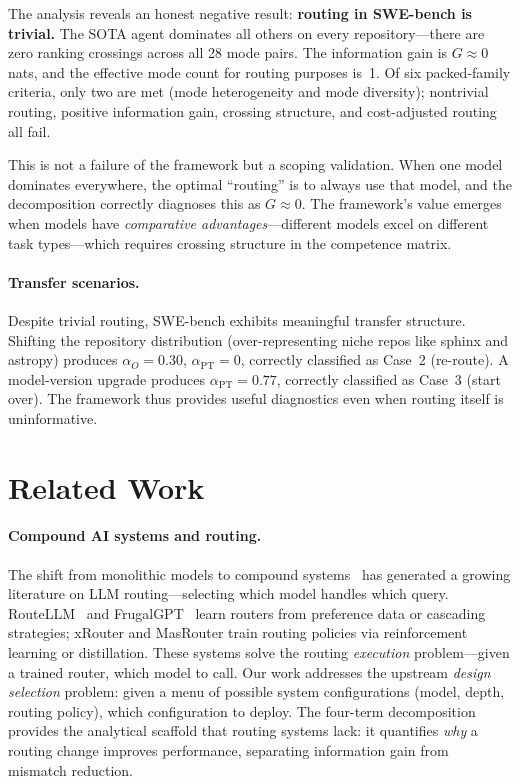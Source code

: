 \documentclass[11pt]{article}
\begin{document}
The analysis reveals an honest negative result: \textbf{routing in
SWE-bench is trivial.}  The SOTA agent dominates all others on every
repository---there are zero ranking crossings across all 28 mode pairs.
The information gain is $G \approx 0$ nats, and the effective mode count
for routing purposes is~1.  Of six packed-family criteria, only two are
met (mode heterogeneity and mode diversity); nontrivial routing, positive
information gain, crossing structure, and cost-adjusted routing all fail.

This is not a failure of the framework but a scoping validation.  When one
model dominates everywhere, the optimal ``routing'' is to always use that
model, and the decomposition correctly diagnoses this as
$G \approx 0$.  The framework's value emerges when models have
\emph{comparative advantages}---different models excel on different task
types---which requires crossing structure in the competence matrix.

\paragraph{Transfer scenarios.}
Despite trivial routing, SWE-bench exhibits meaningful transfer structure.
Shifting the repository distribution (over-representing niche repos like
sphinx and astropy) produces $\alpha_O = 0.30$, $\alpha_{\mathrm{PT}} = 0$,
correctly classified as Case~2 (re-route).  A model-version upgrade
produces $\alpha_{\mathrm{PT}} = 0.77$, correctly classified as Case~3
(start over).  The framework thus provides useful diagnostics even when
routing itself is uninformative.




\section{Related Work}
\label{sec:related}

\paragraph{Compound AI systems and routing.}
The shift from monolithic models to compound
systems~\citep{zaharia2024compound} has generated a growing literature on
LLM routing---selecting which model handles which query.
RouteLLM~\citep{ong2024routellm} and
FrugalGPT~\citep{chen2023frugalgpt} learn routers from preference data
or cascading strategies; xRouter and MasRouter train routing policies via
reinforcement learning or distillation.  These systems solve the routing \emph{execution}
problem---given a trained router, which model to call.  Our work addresses
the upstream \emph{design selection} problem: given a menu of possible
system configurations (model, depth, routing policy), which configuration
to deploy.  The four-term decomposition provides the analytical scaffold
that routing systems lack: it quantifies \emph{why} a routing change
improves performance, separating information gain from mismatch reduction.
\end{document}
